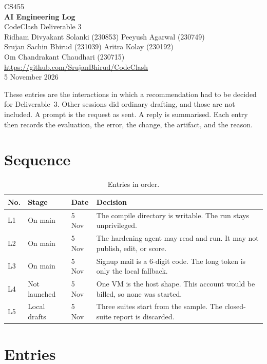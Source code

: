 \documentclass[11pt,a4paper]{article}
\begin{document}
\begin{center}
{\large CS455}\\[0.3em]
{\LARGE\bfseries AI Engineering Log}\\[0.4em]
CodeClash \quad Deliverable 3\\[0.65em]
{\small
Ridham Divyakant Solanki (230853) \quad
Peeyush Agarwal (230749)\\[0.15em]
Srujan Sachin Bhirud (231039) \quad
Aritra Kolay (230192)\\[0.15em]
Om Chandrakant Chaudhari (230715)\\[0.45em]
}
\url{https://github.com/SrujanBhirud/CodeClash}\\[0.1em]
5 November 2026
\end{center}

These entries are the interactions in which a recommendation had to be decided for Deliverable~3. Other sessions did ordinary drafting, and those are not included. A prompt is the request as sent. A reply is summarised. Each entry then records the evaluation, the error, the change, the artifact, and the reason.

\section{Sequence}

\begin{table}[ht]
\centering
\caption{Entries in order.}
\label{tab:record}
{\small
\begin{tabularx}{\textwidth}{@{}l l l Y@{}}
\toprule
No. & Stage & Date & Decision \\
\midrule
L1 & On main & 5 Nov &
The compile directory is writable. The run stays unprivileged. \\
L2 & On main & 5 Nov &
The hardening agent may read and run. It may not publish, edit, or score. \\
L3 & On main & 5 Nov &
Signup mail is a 6-digit code. The long token is only the local fallback. \\
L4 & Not launched & 5 Nov &
One VM is the host shape. This account would be billed, so none was started. \\
L5 & Local drafts & 5 Nov &
Three suites start from the sample. The closed-suite report is discarded. \\
\bottomrule
\end{tabularx}
}
\end{table}

\section{Entries}
\end{document}
